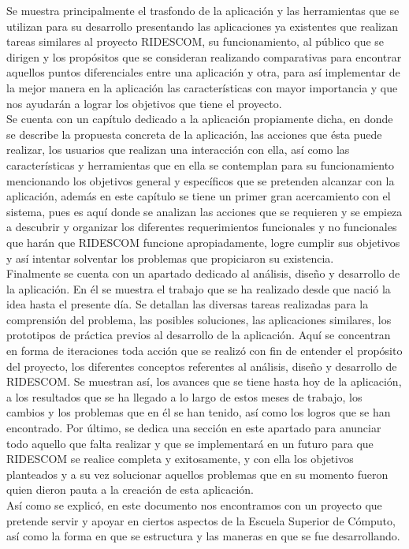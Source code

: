 	Se muestra principalmente el trasfondo de la aplicación y las herramientas que se utilizan para su desarrollo  presentando las aplicaciones ya existentes que realizan tareas similares al proyecto RIDESCOM, su funcionamiento, al público que se dirigen y los propósitos que se consideran realizando comparativas para encontrar aquellos puntos diferenciales entre una aplicación y otra, para así implementar de la mejor manera en la aplicación las características con mayor importancia y que nos ayudarán a lograr los objetivos
	que tiene el proyecto.\\
	Se cuenta con un capítulo dedicado a la aplicación propiamente dicha, en donde se describe la propuesta concreta de la aplicación, las acciones que ésta puede realizar, los usuarios que realizan una interacción con ella, así como las características y herramientas que en ella se contemplan para su funcionamiento mencionando los objetivos general y específicos que se pretenden alcanzar con la aplicación, además en este capítulo se tiene un primer gran acercamiento con el sistema, pues es aquí donde se analizan las acciones que se requieren y se empieza a descubrir y organizar los diferentes requerimientos funcionales y no funcionales que harán que RIDESCOM funcione apropiadamente, logre cumplir sus objetivos y así intentar solventar los problemas que propiciaron su existencia.\\
	Finalmente se cuenta con un apartado dedicado al análisis, diseño y desarrollo de la aplicación. En él se muestra el trabajo que se ha realizado desde que nació la idea hasta el presente día. Se detallan las diversas tareas realizadas para la comprensión del problema, las posibles soluciones, las aplicaciones similares, los prototipos de práctica previos al desarrollo de la aplicación. Aquí se concentran en forma de iteraciones toda acción que se realizó con fin de entender el propósito del proyecto, los diferentes conceptos referentes al análisis, diseño y desarrollo de RIDESCOM. Se muestran así, los avances que se tiene hasta hoy de la aplicación, a los resultados que se ha llegado a lo largo de estos meses de trabajo, los cambios y los problemas que en él se han tenido, así como los logros que se han encontrado. Por último, se dedica una sección en este apartado para anunciar todo aquello que falta realizar y que se implementará en un futuro para que RIDESCOM se realice completa y exitosamente, y con ella los objetivos planteados y a su vez solucionar aquellos problemas que en su momento fueron quien dieron pauta a la creación de esta aplicación.\\
	Así como se explicó, en este documento nos encontramos con un proyecto que pretende servir y apoyar en ciertos aspectos de la Escuela Superior de Cómputo, así como la forma en que se estructura y las maneras en que se fue desarrollando.
	
	
